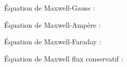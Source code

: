 ﻿\documentclass[a4paper]{article}
\begin{document}
\pagestyle{fancy}
\fancyhf{}
\setlength{\headheight}{15pt}

\begin{center}
	\large{}
\end{center}


Équation de Maxwell-Gauss :\begin{center}\end{center}
Équation de Maxwell-Ampère :\begin{center}\end{center}
Équation de Maxwell-Faraday :\begin{center}\end{center}
Équation de Maxwell flux conservatif :\begin{center}\end{center}
\end{document}
